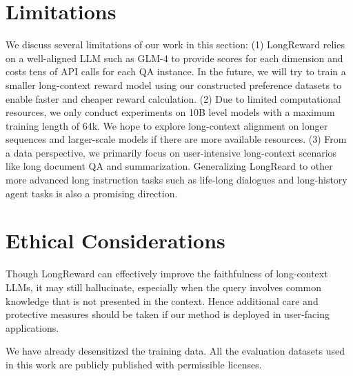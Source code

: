 \section{Limitations}
We discuss several limitations of our work in this section: (1) LongReward relies on a well-aligned LLM such as GLM-4 to provide scores for each dimension and costs tens of API calls for each QA instance. In the future, we will try to train a smaller long-context reward model using our constructed preference datasets to enable faster and cheaper reward calculation. (2) Due to limited computational resources, we only conduct experiments on 10B level models with a maximum training length of 64k. We hope to explore long-context alignment on longer sequences and larger-scale models if there are more available resources. (3) From a data perspective, we primarily focus on user-intensive long-context scenarios like long document QA and summarization. Generalizing LongReard to other more advanced long instruction tasks such as life-long dialogues and long-history agent tasks is also a promising direction. 

\section{Ethical Considerations}
Though LongReward can effectively improve the faithfulness of long-context LLMs, it may still hallucinate, especially when the query involves common knowledge that is not presented in the context. Hence additional care and protective measures should be taken if our method is deployed in user-facing applications. 

We have already desensitized the training data. All the evaluation datasets used in this work are publicly published with permissible licenses. 

\newpage
\onecolumn

